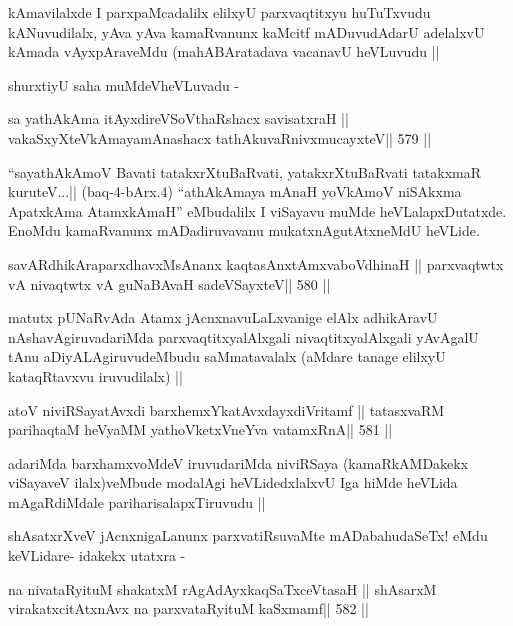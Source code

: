 \begin{artha}
kAmavilalxde I parxpaMcadalilx elilxyU parxvaqtitxyu huTuTxvudu
kANuvudilalx, yAva yAva kamaRvanunx kaMcitf mADuvudAdarU adelalxvU
kAmada vAyxpAraveMdu (mahABAratadava vacanavU heVLuvudu || 

shurxtiyU saha muMdeVheVLuvadu -
\end{artha}

\begin{shl}
sa yathAkAma itAyxdireVSoV\s thaRshacx savisatxraH ||
vakaSxyXteV\s kAmayamAnashacx tathA\s kuvaRnivxmucayxteV\hfill || 579 ||
\end{shl}

\begin{artha}
``sayathAkAmoV Bavati tatakxrXtuBaRvati, yatakxrXtuBaRvati tatakxmaR
  kuruteV...|| (baq-4-bArx.4) ``athA\s kAmaya mAnaH yoV\s kAmoV
  niSAkxma ApatxkAma AtamxkAmaH'' eMbudalilx I viSayavu muMde
  heVLalapxDutatxde. EnoMdu kamaRvanunx mADadiruvavanu
  mukatxnAgutAtxneMdU heVLide.
\end{artha}

\begin{shl}
savARdhikAraparxdhavxMsAnanx kaqtasAnxtAmxvaboVdhinaH ||
parxvaqtwtx vA nivaqtwtx vA guNaBAvaH sadeVSayxteV\hfill || 580 ||
\end{shl}

\begin{artha}
matutx pUNaRvAda Atamx jAcnxnavuLaLxvanige elAlx adhikAravU
nAshavAgiruvadariMda parxvaqtitxyalAlxgali nivaqtitxyalAlxgali
yAvAgalU tAnu aDiyALAgiruvudeMbudu saMmatavalalx (aMdare tanage
elilxyU kataqRtavxvu iruvudilalx) ||
\end{artha}

\begin{shl}
atoV niviRSayatAvxdi barxhemxYkatAvxdayxdiVritamf ||
tatasxvaRM parihaqtaM heVyaMM yathoVketxVneYva vatamxRnA\hfill || 581 ||
\end{shl}

\begin{artha}
adariMda barxhamxvoMdeV iruvudariMda niviRSaya (kamaRkAMDakekx
viSayaveV ilalx)veMbude modalAgi heVLidedxlalxvU Iga hiMde heVLida
mAgaRdiMdale pariharisalapxTiruvudu ||

shAsatxrXveV jAcnxnigaLanunx parxvatiRsuvaMte mADabahudaSeTx! eMdu
keVLidare- idakekx utatxra -
\end{artha}

\begin{shl}
na nivataRyituM shakatxM rAgAdAyxkaqSaTxceVtasaH ||
shAsarxM virakatxcitAtxnAvx na parxvataRyituM kaSxmamf\hfill || 582 ||
\end{shl}

